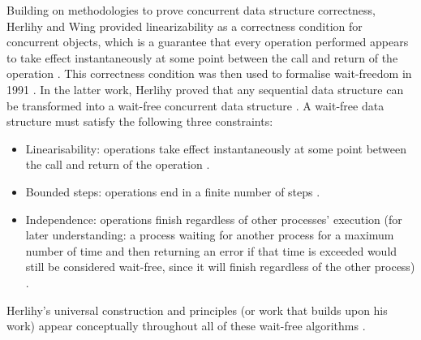 Building on methodologies to prove concurrent data structure correctness, Herlihy and Wing provided linearizability as a correctness condition for concurrent objects, which is a guarantee that every operation performed appears to take effect instantaneously at some point between the call and return of the operation \cite{HerlihyLinearizability}. This correctness condition was then used to formalise wait-freedom in 1991 \cite{herlihy1991wait}. In the latter work, Herlihy proved that any sequential data structure can be transformed into a wait-free concurrent data structure \cite{herlihy1991wait}. A wait-free data structure must satisfy the following three constraints: 
\begin{itemize}
   \item Linearisability: operations take effect instantaneously at some point between the call and return of the operation \cite{herlihy1991wait}.
   \item Bounded steps: operations end in a finite number of steps \cite{herlihy1991wait}.
   \item Independence: operations finish regardless of other processes' execution (for later understanding: a process waiting for another process for a maximum number of time and then returning an error if that time is exceeded would still be considered wait-free, since it will finish regardless of the other process) \cite{herlihy1991wait}.
\end{itemize}

Herlihy's universal construction and principles (or work that builds upon his work) appear conceptually throughout all of these wait-free algorithms \cite{Kogan2011WaitFreeQueues,FeldmanDechev2015WaitFreeRingBuffer,kogan2012methodology,FeldmanDechevV2,FeldmanDechevV3,RamalheteQueue,wCQWaitFreeQueue,Verma2013Scalable,FastFetchAndAddWaitFreeQueue,WangCacheCoherent,adampsc,jiffy,JayantiLog,Drescher2015GuardedSections,Mateíspmc,torquati2010singleproducersingleconsumerqueuessharedcache,Aldinucci2012EfficientSync,Wang2013BQueue,MaffioneCacheAware,ffq}. \cite{herlihy1991wait}

